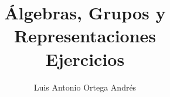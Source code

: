 \documentclass[UTF8]{article}
\begin{document}
\title{Álgebras, Grupos y Representaciones \\
      \large Ejercicios
  }

\author{Luis Antonio Ortega Andrés}

\maketitle












\end{document}
